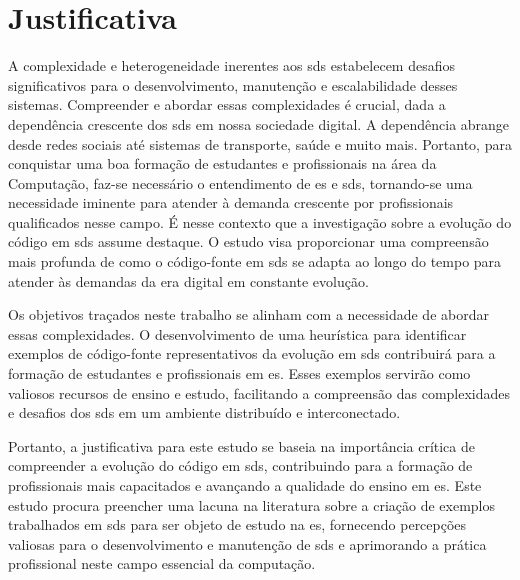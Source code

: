 \section{Justificativa}\label{sec:justificativa}
A complexidade e heterogeneidade inerentes aos \gls{sds} estabelecem desafios significativos para o desenvolvimento, manutenção e escalabilidade desses sistemas. Compreender e abordar essas complexidades é crucial, dada a dependência crescente dos \gls{sds} em nossa sociedade digital. A dependência abrange desde redes sociais até sistemas de transporte, saúde e muito mais. Portanto, para conquistar uma boa formação de estudantes e profissionais na área da Computação, faz-se necessário o entendimento de \gls{es} e \gls{sds}, tornando-se uma necessidade iminente para atender à demanda crescente por profissionais qualificados nesse campo.
É nesse contexto que a investigação sobre a evolução do código em \gls{sds} assume destaque. O estudo visa proporcionar uma compreensão mais profunda de como o código-fonte em \gls{sds} se adapta ao longo do tempo para atender às demandas da era digital em constante evolução.

Os objetivos traçados neste trabalho se alinham com a necessidade de abordar essas complexidades. O desenvolvimento de uma heurística para identificar exemplos de código-fonte representativos da evolução em \gls{sds} contribuirá para a formação de estudantes e profissionais em \gls{es}. Esses exemplos servirão como valiosos recursos de ensino e estudo, facilitando a compreensão das complexidades e desafios dos \gls{sds} em um ambiente distribuído e interconectado.

Portanto, a justificativa para este estudo se baseia na importância crítica de compreender a evolução do código em \gls{sds}, contribuindo para a formação de profissionais mais capacitados e avançando a qualidade do ensino em \gls{es}. Este estudo procura preencher uma lacuna na literatura sobre a criação de exemplos trabalhados em \gls{sds} para ser objeto de estudo na \gls{es}, fornecendo percepções valiosas para o desenvolvimento e manutenção de \gls{sds} e aprimorando a prática profissional neste campo essencial da computação.

